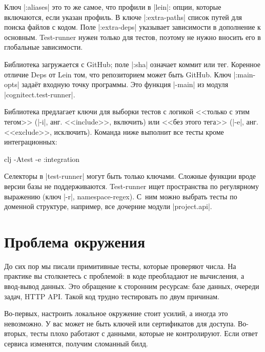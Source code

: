 
Ключ \spverb|:aliases| это то же самое, что профили в \spverb|lein|: опции,
которые включаются, если указан профиль. В ключе \spverb|:extra-paths| список
путей для поиска файлов с кодом. Поле \spverb|:extra-deps| указывает зависимости
в дополнение к основным. Test-runner нужен только для тестов, поэтому не нужно
вносить его в глобальные зависимости.

Библиотека загружается с GitHub; поле \spverb|:sha| означает коммит или
тег. Коренное отличие Deps от Lein том, что репозиторием может быть GitHub. Ключ
\spverb|:main-opts| задаёт входную точку программы. Это функция \spverb|-main|
из модуля \spverb|cognitect.test-runner|.

Библиотека предлагает ключи для выборки тестов с логикой <<только с этим тегом>>
(\spverb|-i|, анг. <<include>>, включить) или <<без этого тега>> (\spverb|-e|,
анг. <<exclude>>, исключить). Команда ниже выполнит все тесты кроме
интеграционных:

\begin{english}
  \begin{bash}
clj -Atest -e :integration
  \end{bash}
\end{english}

Селекторы в \spverb|test-runner| могут быть только ключами. Сложные функции
вроде версии базы не поддерживаются. Test-runner ищет пространства по
регулярному выражению (ключ \spverb|-r|, namespace-regex). С~ним можно выбрать
тесты по доменной структуре, например, все дочерние модули \spverb|project.api|.

\section{Проблема окружения}


До сих пор мы писали примитивные тесты, которые проверяют числа. На практике вы
столкнетесь с проблемой: в коде преобладают не вычисления, а ввод-вывод
данных. Это обращение к сторонним ресурсам: базе данных, очереди задач, HTTP
API. Такой код трудно тестировать по двум причинам.

Во-первых, настроить локальное окружение стоит усилий, а иногда это
невозможно. У вас может не быть ключей или сертификатов для доступа. Во-вторых,
тесты плохо работают с данными, которые не контролируют. Если ответ сервиса
изменятся, получим сломанный билд.

